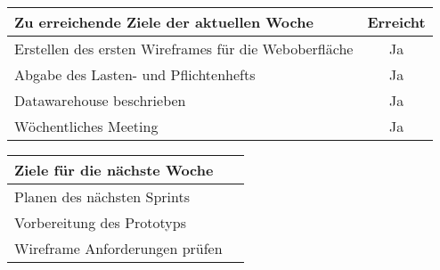 \begin{tabularx}{\textwidth}{Xc}
    \arrayrulecolor{OliveGreen}
    \toprule
    {\bfseries Zu erreichende Ziele der aktuellen Woche} & {\bfseries Erreicht} \\
    \midrule[2pt]
    Erstellen des ersten Wireframes für die Weboberfläche  &Ja               \\
    \rowcolor{OliveGreen!15}
    Abgabe des Lasten- und Pflichtenhefts                  &Ja               \\
    \rowcolor{OliveGreen!15}
    Datawarehouse beschrieben                              &Ja               \\
    \rowcolor{OliveGreen!15}
    Wöchentliches Meeting                                  &Ja               \\
   \bottomrule[2pt]
\end{tabularx}
%
\vspace{1cm}
%
\begin{tabularx}{\textwidth}{Xc}
    \arrayrulecolor{OliveGreen}
    \toprule
    {\bfseries Ziele für die nächste Woche}              &                   \\
    \midrule[2pt]
    Planen des nächsten Sprints                          &                   \\
    \rowcolor{OliveGreen!15}
    Vorbereitung des Prototyps                           &                   \\
    \rowcolor{OliveGreen!15}
    Wireframe Anforderungen prüfen & \\
\end{tabularx}
